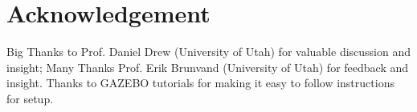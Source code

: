 \documentclass[conference]{IEEEtran}
\begin{document}
\section*{Acknowledgement}
Big Thanks to Prof. Daniel Drew (University of Utah) for valuable discussion and insight; Many Thanks Prof. Erik Brunvand (University of Utah) for feedback and insight. Thanks to GAZEBO tutorials for making it easy to follow instructions for setup.


\nocite{*}

\vspace{12pt}
\end{document}
